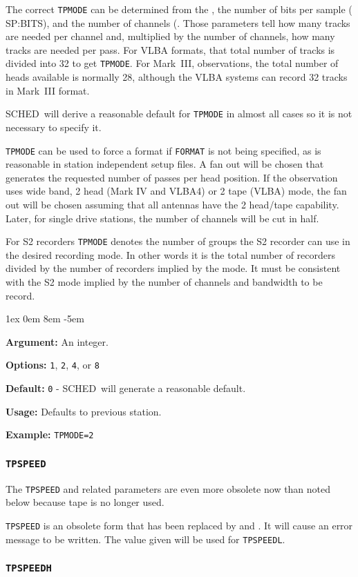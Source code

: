\documentclass{report}
\newcommand{\schedb}{{\sc SCHED~}}
\newcommand{\rcwbox}[5]{
  \begin{list}{}{\parsep 1ex  \itemsep 0em
                 \leftmargin 8em  \itemindent -5em }
    \item {\bf Argument:} #1
    \item {\bf Options:}  #2
    \item {\bf Default:}  #3
    \item {\bf Usage:}    #4
    \item {\bf Example:}  #5
  \end{list}
}
\begin{document}
The correct {\tt TPMODE} can be determined from the , the number of bits per sample (
{SP:BITS}), and the number of channels (.
Those parameters tell how many tracks are needed per channel and,
multiplied by the number of channels, how many tracks are needed per
pass.  For VLBA formats, that total number of tracks is divided into
32 to get {\tt TPMODE}.  For Mark~III, observations, the total number
of heads available is normally 28, although the VLBA systems can
record 32 tracks in Mark~III format.

\schedb will derive a reasonable default for {\tt TPMODE} in almost
all cases so it is not necessary to specify it.

{\tt TPMODE} can be used to force a format if {\tt FORMAT} is not being
specified, as is reasonable in station independent setup files.  A fan
out will be chosen that generates the requested number of passes per
head position.  If the observation uses wide band, 2 head (Mark IV and
VLBA4) or 2 tape (VLBA) mode, the fan out will be chosen assuming that
all antennas have the 2 head/tape capability.  Later, for single drive
stations, the number of channels will be cut in half.

For S2 recorders {\tt TPMODE} denotes the number of groups the S2
recorder can use in the desired recording mode. In other words it is
the total number of recorders divided by the number of recorders
implied by the mode. It must be consistent with the S2 mode implied by
the number of channels and bandwidth to be record.

\rcwbox
{An integer.}
{{\tt 1}, {\tt 2}, {\tt 4}, or {\tt 8}}
{{\tt 0} - \schedb will generate a reasonable default.}
{Defaults to previous station.}
{{\tt TPMODE=2}}


\subsubsection{\label{SP:TPSPEED}{\tt TPSPEED}}

The {\tt TPSPEED}  and related parameters are even more obsolete
now than noted below because tape is no longer used.

{\tt TPSPEED} is an obsolete form that has been replaced by
 and
.  It will cause an
error message to be written.  The value given will be used for
{\tt TPSPEEDL}.

\subsubsection{\label{SP:TPSPEEDH}{\tt TPSPEEDH}}
\end{document}
